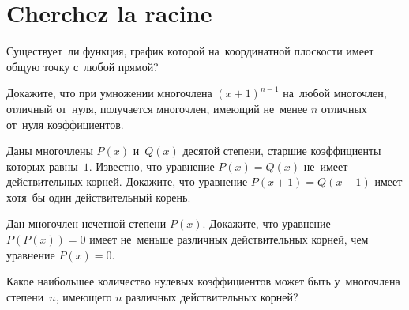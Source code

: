 
\section*{Cherchez la racine}


\begin{problems}

\item
Существует~ли функция, график которой на~координатной плоскости имеет общую
точку с~любой прямой?

\item
Докажите, что при умножении многочлена $(x + 1)^{n-1}$ на~любой многочлен,
отличный от~нуля, получается многочлен, имеющий не~менее $n$ отличных от~нуля
коэффициентов.

\item
Даны многочлены $P(x)$ и~$Q(x)$ десятой степени, старшие коэффициенты которых
равны~$1$.
Известно, что уравнение $P(x) = Q(x)$ не~имеет действительных корней.
Докажите, что уравнение $P(x + 1) = Q(x - 1)$ имеет хотя~бы один действительный
корень.

\item
Дан многочлен нечетной степени $P(x)$.
Докажите, что уравнение  $P(P(x)) = 0$ имеет не~меньше различных действительных
корней, чем уравнение $P(x) = 0$.

\item
Какое наибольшее количество нулевых коэффициентов может быть у~многочлена
степени~$n$, имеющего $n$ различных действительных корней?

\end{problems}

